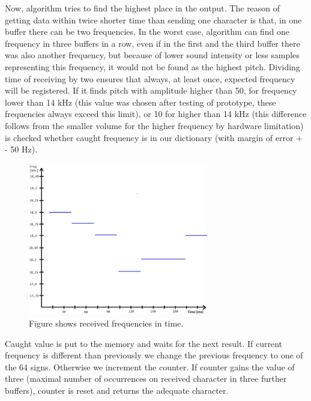 \documentclass[11pt,titlepage]{article}
\theoremstyle{plain}
\begin{document}
Now, algorithm tries to find the highest place in the output. The reason of getting data within twice shorter time than sending one character is that, in one buffer there can be two frequencies. In the worst case, algorithm can find one frequency in three buffers in a row, even if in the first and the third buffer there was also another frequency, but because of lower sound intensity or less samples representing this frequency, it would not be found as the highest pitch. Dividing time of receiving by two ensures that always, at least once, expected frequency will be registered. If it finds pitch with amplitude higher than 50, for frequency lower than 14 kHz (this value was chosen after testing of prototype, these frequencies always exceed this limit), or 10 for higher than 14 kHz (this difference follows from the smaller volume for the higher frequency by hardware limitation) is checked whether caught frequency is in our dictionary (with margin of error + - 50 Hz). 


\begin{figure}[H]
	\centering
	\includegraphics[width=0.70\textwidth]{img/receiving}
	\caption{Figure shows received frequencies in time.}
\end{figure}

Caught value is put to the memory and waits for the next result. If current frequency is different than previously we change the previous frequency to one of the 64 signs. Otherwise we increment the counter. If counter gains the value of three (maximal number of occurrences on received character in three further buffers), counter is reset and returns the adequate character.
\end{document}
